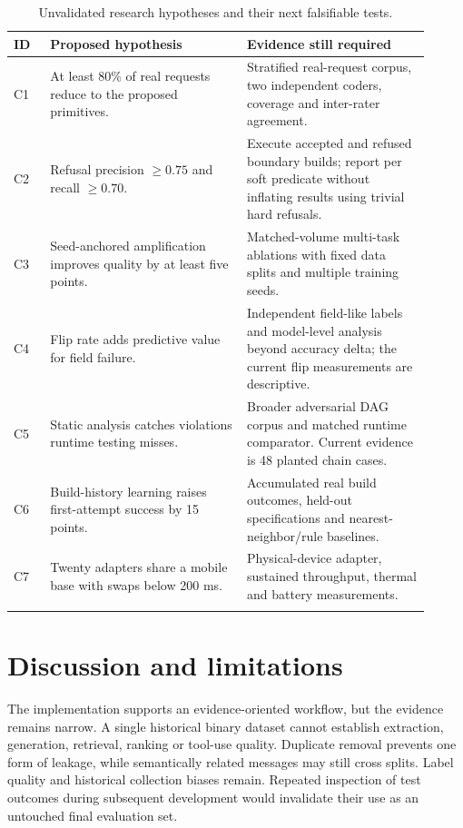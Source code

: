 \documentclass[11pt,a4paper]{article}
\begin{document}
\begin{longtable}{p{0.08\linewidth}p{0.43\linewidth}p{0.40\linewidth}}
\toprule
ID & Proposed hypothesis & Evidence still required \\
\midrule\endhead
C1 & At least 80\% of real requests reduce to the proposed primitives. & Stratified real-request corpus, two independent coders, coverage and inter-rater agreement. \\
C2 & Refusal precision $\geq0.75$ and recall $\geq0.70$. & Execute accepted and refused boundary builds; report per soft predicate without inflating results using trivial hard refusals. \\
C3 & Seed-anchored amplification improves quality by at least five points. & Matched-volume multi-task ablations with fixed data splits and multiple training seeds. \\
C4 & Flip rate adds predictive value for field failure. & Independent field-like labels and model-level analysis beyond accuracy delta; the current flip measurements are descriptive. \\
C5 & Static analysis catches violations runtime testing misses. & Broader adversarial DAG corpus and matched runtime comparator. Current evidence is 48 planted chain cases. \\
C6 & Build-history learning raises first-attempt success by 15 points. & Accumulated real build outcomes, held-out specifications and nearest-neighbor/rule baselines. \\
C7 & Twenty adapters share a mobile base with swaps below 200 ms. & Physical-device adapter, sustained throughput, thermal and battery measurements. \\
\bottomrule
\caption{Unvalidated research hypotheses and their next falsifiable tests.}
\label{tab:claims}
\end{longtable}

\section{Discussion and limitations}
The implementation supports an evidence-oriented workflow, but the evidence
remains narrow. A single historical binary dataset cannot establish extraction,
generation, retrieval, ranking or tool-use quality. Duplicate removal prevents
one form of leakage, while semantically related messages may still cross splits.
Label quality and historical collection biases remain. Repeated inspection of
test outcomes during subsequent development would invalidate their use as an
untouched final evaluation set.
\end{document}
